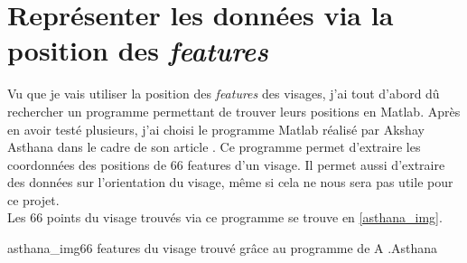 \documentclass[poster]{polytech/polytech}
\begin{document}
\section{Représenter les données via la position des \textit{features}}
Vu que je vais utiliser la position des \textit{features} des visages, j'ai tout d'abord dû rechercher un programme permettant de trouver leurs positions en Matlab. Après en avoir testé plusieurs, j'ai choisi le programme Matlab réalisé par Akshay Asthana dans le cadre de son article \cite{asthana}. Ce programme permet d'extraire les coordonnées des positions de 66 features d'un visage. Il permet aussi d'extraire des données sur l'orientation du visage, même si cela ne nous sera pas utile pour ce projet.\\
Les 66 points du visage trouvés via ce programme se trouve en \autoref{asthana_img}.

\begin{Figure}{asthana_img}{66 features du visage trouvé grâce au programme de A .Asthana}
\end{Figure}
\end{document}
